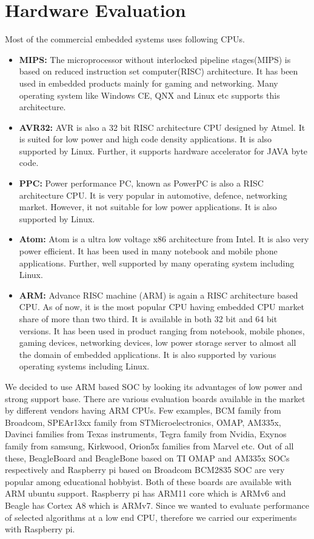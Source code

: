 \section {Hardware Evaluation}
\indent Most of the commercial embedded systems uses following CPUs.
\begin{itemize}
	\item \textbf{MIPS:} The microprocessor without interlocked
		pipeline stages(MIPS) is based on reduced instruction
		set computer(RISC) architecture. It has been used in
		embedded products mainly for gaming and networking. Many
		operating system like Windows CE, QNX and Linux etc
		supports this architecture.
	\item \textbf{AVR32:} AVR is also a 32 bit RISC architecture CPU
		designed by Atmel. It is suited for low power and high
		code density applications.  It is also supported by
		Linux. Further, it supports hardware accelerator for
		JAVA byte code.
	\item \textbf{PPC:} Power performance PC, known as PowerPC is
		also a RISC architecture CPU. It is very popular in
		automotive, defence, networking market. However, it not
		suitable for low power applications. It is also
		supported by Linux.
	\item \textbf{Atom:} Atom is a ultra low voltage x86
		architecture from Intel. It is also very power
		efficient. It has been used in many notebook and mobile
		phone applications. Further, well supported by many
		operating system including Linux.
	\item \textbf{ARM:} Advance RISC machine (ARM) is again a RISC
		architecture based CPU. As of now, it is the most
		popular CPU having embedded CPU market share of more
		than two third. It is available in both 32 bit and 64
		bit versions. It has been used in product ranging from
		notebook, mobile phones, gaming devices, networking
		devices, low power storage server to almost all the
		domain of embedded applications. It is also supported by
		various operating systems including Linux.
\end{itemize}

We decided to use ARM based SOC by looking its advantages of low power
and strong support base. There are various evaluation boards available
in the market by different vendors having ARM CPUs. Few examples, BCM
family from Broadcom, SPEAr13xx family from STMicroelectronics, OMAP,
AM335x, Davinci families from Texas instruments, Tegra family from
Nvidia, Exynos family from samsung, Kirkwood, Orion5x families from
Marvel etc. Out of all these, BeagleBoard and BeagleBone based on TI
OMAP and AM335x SOCs respectively and Raspberry pi based on Broadcom
BCM2835 SOC are very popular among educational hobbyist. Both of these
boards are available with ARM ubuntu support. Raspberry pi has ARM11
core which is ARMv6 and Beagle has Cortex A8 which is ARMv7. Since we
wanted to evaluate performance of selected algorithms at a low end CPU,
therefore we carried our experiments with Raspberry pi.

